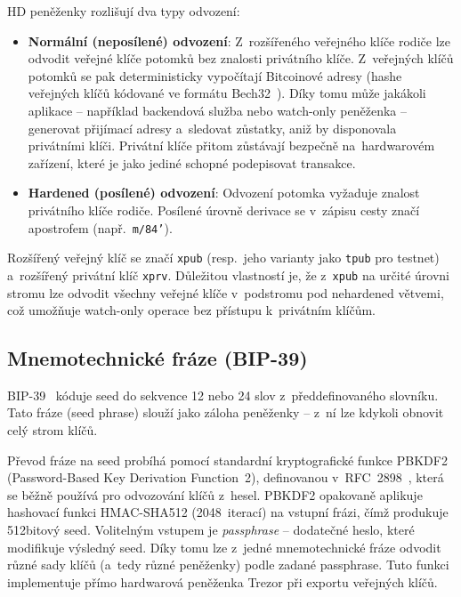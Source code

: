 HD peněženky rozlišují dva typy odvození:

\begin{itemize}
  \item \textbf{Normální (neposílené) odvození}: Z~rozšířeného veřejného klíče
    rodiče lze odvodit veřejné klíče potomků bez znalosti privátního klíče.
    Z~veřejných klíčů potomků se pak deterministicky vypočítají Bitcoinové
    adresy (hashe veřejných klíčů kódované ve formátu Bech32~\citep{BIP173}).
    Díky tomu může
    jakákoli aplikace -- například backendová služba nebo watch-only peněženka --
    generovat přijímací adresy a~sledovat zůstatky, aniž by disponovala
    privátními klíči. Privátní klíče přitom zůstávají bezpečně na~hardwarovém
    zařízení, které je jako jediné schopné podepisovat transakce.
  \item \textbf{Hardened (posílené) odvození}: Odvození potomka vyžaduje znalost
    privátního klíče rodiče. Posílené úrovně derivace se v~zápisu cesty značí
    apostrofem (např.\ \texttt{m/84'}).
\end{itemize}

Rozšířený veřejný klíč se značí \texttt{xpub} (resp.\ jeho varianty jako
\texttt{tpub} pro testnet) a~rozšířený privátní klíč \texttt{xprv}. Důležitou
vlastností je, že z~\texttt{xpub} na určité úrovni stromu lze odvodit všechny
veřejné klíče v~podstromu pod nehardened větvemi, což umožňuje watch-only
operace bez přístupu k~privátním klíčům.

\subsection{Mnemotechnické fráze (BIP-39)}
\label{sec:bip39}

BIP-39~\citep{BIP39} kóduje seed do sekvence 12 nebo 24 slov z~předdefinovaného
slovníku. Tato fráze (seed phrase) slouží jako záloha peněženky -- z~ní lze
kdykoli obnovit celý strom klíčů.

Převod fráze na seed probíhá pomocí standardní kryptografické funkce PBKDF2
(Password-Based Key Derivation Function~2), definovanou v~RFC~2898~\cite{RFC2898},
která se běžně používá pro odvozování klíčů z~hesel. PBKDF2 opakovaně aplikuje
hashovací funkci HMAC-SHA512 (2048~iterací) na vstupní frázi, čímž produkuje
512bitový seed. Volitelným vstupem je \emph{passphrase} -- dodatečné heslo,
které modifikuje výsledný seed. Díky tomu lze z~jedné mnemotechnické fráze
odvodit různé sady klíčů (a~tedy různé peněženky) podle zadané passphrase.
Tuto funkci implementuje přímo hardwarová peněženka Trezor při exportu
veřejných klíčů.

